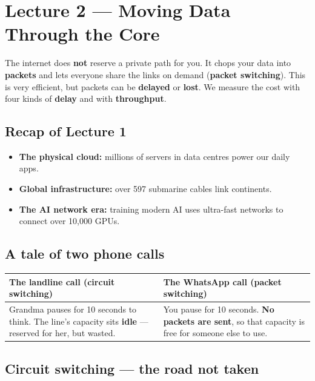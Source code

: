 \chapter{Lecture 2 --- Moving Data Through the Core}

\begin{keyidea}
The internet does \textbf{not} reserve a private path for you. It chops your data into \textbf{packets} and lets everyone share the links on demand (\textbf{packet switching}). This is very efficient, but packets can be \textbf{delayed} or \textbf{lost}. We measure the cost with four kinds of \textbf{delay} and with \textbf{throughput}.
\end{keyidea}

\section{Recap of Lecture 1}
\begin{itemize}
  \item \textbf{The physical cloud:} millions of servers in data centres power our daily apps.
  \item \textbf{Global infrastructure:} over 597 submarine cables link continents.
  \item \textbf{The AI network era:} training modern AI uses ultra-fast networks to connect over 10{,}000 GPUs.
\end{itemize}

\section{A tale of two phone calls}

\begin{center}
\begin{tabularx}{\textwidth}{X X}
\toprule
\textbf{The landline call (circuit switching)} & \textbf{The WhatsApp call (packet switching)} \\
\midrule
Grandma pauses for 10 seconds to think. The line's capacity sits \textbf{idle} --- reserved for her, but wasted. & You pause for 10 seconds. \textbf{No packets are sent}, so that capacity is free for someone else to use. \\
\bottomrule
\end{tabularx}
\end{center}

\section{Circuit switching --- the road not taken}

